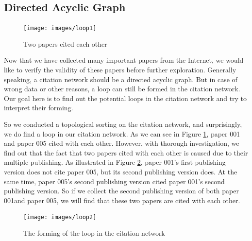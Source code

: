 \subsection{Directed Acyclic Graph}
\begin{figure}[ht!]
\texttt{[image: images/loop1]}
\caption {Two papers cited each other}
\label {F:loop1}
\end{figure}
Now that we have collected many important papers from the Internet, we would like to verify the validity of these papers before further exploration. Generally speaking, a citation network should be a directed acyclic graph. But in case of wrong data or other reasons, a loop can still be formed in the citation network. Our goal here is to find out the potential loops in the citation network and try to interpret their forming. 

So we conducted a topological sorting on the citation network, and surprisingly, we do find a loop in our citation network. As we can see in Figure \ref{F:loop1}, paper 001 \cite{Foster01theanatomy}  and paper 005 \cite{Frey01condor} cited with each other. However, with thorough investigation, we find out that the fact that two papers cited with each other is caused due to their multiple publishing. As illustrated in Figure \ref{F:loop2},  paper 001's first publishing version does not cite paper 005, but its second publishing version does. At the same time, paper 005's second publishing version cited paper 001's second publishing version. So if we collect the second publishing version of both paper 001and paper 005, we will find that these two papers are cited with each other.

\begin{figure}[ht!]
\texttt{[image: images/loop2]}
\caption {The forming of the loop in the citation network }
\label {F:loop2}
\end{figure}


